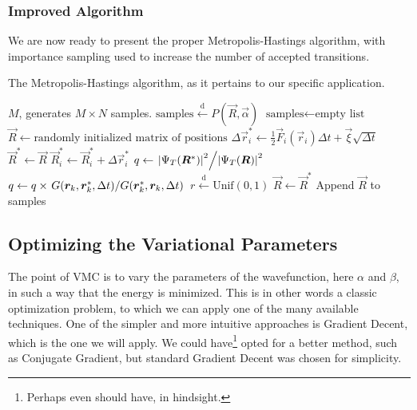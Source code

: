 \documentclass[a4paper, 11pt]{article}
\newcommand{\setfrom}{\overset{\mathrm{d}}{\leftarrow}}
\begin{document}
\begin{multicols}{2}
\subsubsection{Improved Algorithm}
We are now ready to present the proper Metropolis-Hastings algorithm, with
importance sampling used to increase the number of accepted transitions.

\begin{algorithm}[H]
    \caption{The Metropolis-Hastings algorithm, as it
    pertains to our specific application.}
    \label{alg:metropolis-importance}
    \begin{algorithmic}[1]
        \REQUIRE $M$, generates $M\times N$ samples.
        \ENSURE $\text{samples} \setfrom P(\vec R, \vec\alpha)$
        \STATE $\text{samples} \leftarrow \text{empty list}$
        \STATE $\vec R \leftarrow \text{randomly initialized matrix of positions}$
                \STATE $\Delta\vec r_i^* \leftarrow \frac{1}{2}\vec
                F_i(\vec r_i)\Delta t + \vec \xi\sqrt{\Delta t}$
                \STATE $\vec R^*\leftarrow \vec R $
                \STATE $\vec R^*_i \leftarrow \vec R^{*}_i+ \Delta \vec r_i^*$ 
                \STATE $q \leftarrow \flatfrac{\abs{\Psi_T(\vec R^*)}^2}{\abs{\Psi_T(\vec R)}^2}$
                \STATE $q \leftarrow q \times \flatfrac{G(\vec r_k, \vec r_k^*,
                    \Delta t)}{G(\vec r_k^*, \vec r_k, \Delta t)}$
                \STATE $r \setfrom \text{Unif}(0, 1)$
                    \STATE $\vec R \leftarrow \vec R^*$
                \ENDIF
                \STATE Append $\vec R$ to samples
            \ENDFOR
        \ENDFOR
    \end{algorithmic}
\end{algorithm}

\subsection{Optimizing the Variational Parameters}

The point of VMC is to vary the parameters of the wavefunction, here $\alpha$
and $\beta$, in such a way that the energy is minimized. This is in other words
a classic optimization problem, to which we can apply one of the many available
techniques. One of the simpler and more intuitive approaches is Gradient Decent,
which is the one we will apply. We could have\footnote{Perhaps even should have,
in hindsight.} opted for a better method, such as Conjugate Gradient, but
standard Gradient Decent was chosen for simplicity.


\end{multicols}
\end{document}
